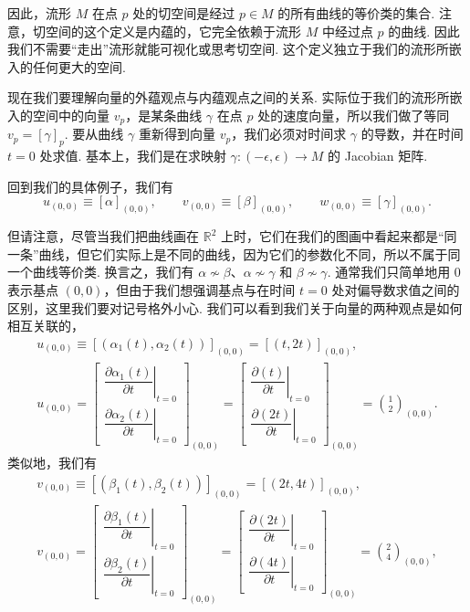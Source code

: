 因此，流形 $M$ 在点 $p$ 处的切空间是经过 $p\in M$ 的所有曲线的等价类的集合. 注意，切空间的这个定义是内蕴的，它完全依赖于流形 $M$ 中经过点 $p$ 的曲线. 因此我们不需要``走出''流形就能可视化或思考切空间. 这个定义独立于我们的流形所嵌入的任何更大的空间.

现在我们要理解向量的外蕴观点与内蕴观点之间的关系. 实际位于我们的流形所嵌入的空间中的向量 $v_p$，是某条曲线 $\gamma$ 在点 $p$ 处的速度向量，所以我们做了等同 $v_p=[\gamma]_p$. 要从曲线 $\gamma$ 重新得到向量 $v_p$，我们必须对时间求 $\gamma$ 的导数，并在时间 $t=0$ 处求值. 基本上，我们是在求映射 $\gamma:(-\epsilon,\epsilon)\to M$ 的 Jacobian 矩阵.

回到我们的具体例子，我们有
\[
u_{(0,0)}\equiv[\alpha]_{(0,0)},\qquad v_{(0,0)}\equiv[\beta]_{(0,0)},\qquad w_{(0,0)}\equiv[\gamma]_{(0,0)}.
\]

但请注意，尽管当我们把曲线画在 $\mathbb{R}^2$ 上时，它们在我们的图画中看起来都是``同一条''曲线，但它们实际上是不同的曲线，因为它们的参数化不同，所以不属于同一个曲线等价类. 换言之，我们有 $\alpha\nsim\beta$、$\alpha\nsim\gamma$ 和 $\beta\nsim\gamma$. 通常我们只简单地用 $0$ 表示基点 $(0,0)$，但由于我们想强调基点与在时间 $t=0$ 处对偏导数求值之间的区别，这里我们要对记号格外小心. 我们可以看到我们关于向量的两种观点是如何相互关联的，
\begin{align*}
u_{(0,0)}\equiv\left[\left(\alpha_1(t),\alpha_2(t)\right)\right]_{(0,0)}=\left[(t,2t)\right]_{(0,0)}, \\
u_{(0,0)}=\begin{bmatrix}\left.\dfrac{\partial\alpha_1(t)}{\partial t}\right|_{t=0}\\[1.2em] \left.\dfrac{\partial\alpha_2(t)}{\partial t}\right|_{t=0}\end{bmatrix}_{(0,0)}=\begin{bmatrix}\left.\dfrac{\partial(t)}{\partial t}\right|_{t=0}\\[1.2em] \left.\dfrac{\partial(2t)}{\partial t}\right|_{t=0}\end{bmatrix}_{(0,0)}=\binom{1}{2}_{(0,0)}.
\end{align*}
类似地，我们有
\begin{align*}
v_{(0,0)}\equiv\left[\left(\beta_1(t),\beta_2(t)\right)\right]_{(0,0)}=\left[(2t,4t)\right]_{(0,0)}, \\
v_{(0,0)}=\begin{bmatrix}\left.\dfrac{\partial\beta_1(t)}{\partial t}\right|_{t=0}\\[1.2em] \left.\dfrac{\partial\beta_2(t)}{\partial t}\right|_{t=0}\end{bmatrix}_{(0,0)}=\begin{bmatrix}\left.\dfrac{\partial(2t)}{\partial t}\right|_{t=0}\\[1.2em] \left.\dfrac{\partial(4t)}{\partial t}\right|_{t=0}\end{bmatrix}_{(0,0)}=\binom{2}{4}_{(0,0)},
\end{align*}
